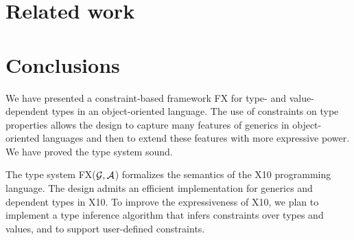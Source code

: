 \documentclass[preprint,nocopyrightspace,9pt]{sigplanconf}
\newcommand\Xten{{\sf X10}\xspace}
\def\FX{{\sf FX}\xspace}
\def\FXGD{{\sf FX(${\cal G},{\cal A}$)}\xspace}
\begin{document}
\section{Related work}
\label{sec:related}


\section{Conclusions}
\label{sec:conclusions}

We have presented a constraint-based framework \FX{} for type-
and value-dependent types in an object-oriented language.
%
The use of constraints on type properties allows the design to
capture many features of generics in object-oriented languages
and then to extend these features with more
expressive power.  We have proved the type system sound.

The type system \FXGD{} formalizes the semantics of the \Xten{}
programming language.  The design admits an efficient
implementation for generics and dependent types in \Xten{}.
To improve the expressiveness of \Xten{}, we plan to implement
a type inference algorithm that infers constraints over types
and values, and to support user-defined constraints.







% 
\end{document}
